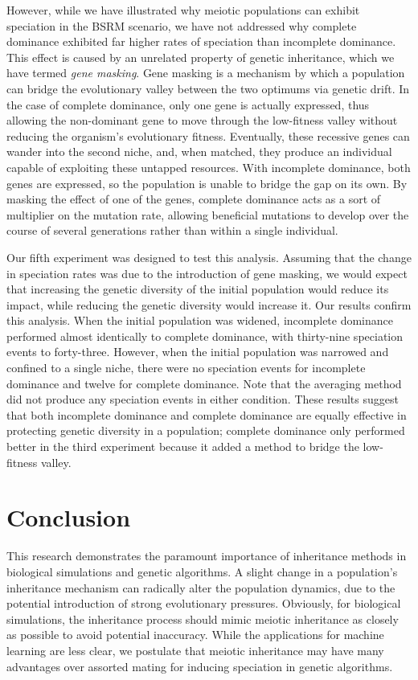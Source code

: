 \documentclass{article}
\begin{document}
However, while we have illustrated why meiotic populations can exhibit speciation in the BSRM scenario, we have not addressed why complete dominance exhibited far higher rates of speciation than incomplete dominance. This effect is caused by an unrelated property of genetic inheritance, which we have termed \textit{gene masking}. Gene masking is a mechanism by which a population can bridge the evolutionary valley between the two optimums via genetic drift. In the case of complete dominance, only one gene is actually expressed, thus allowing the non-dominant gene to move through the low-fitness valley without reducing the organism’s evolutionary fitness. Eventually, these recessive genes can wander into the second niche, and, when matched, they produce an individual capable of exploiting these untapped resources. With incomplete dominance, both genes are expressed, so the population is unable to bridge the gap on its own. By masking the effect of one of the genes, complete dominance acts as a sort of multiplier on the mutation rate, allowing beneficial mutations to develop over the course of several generations rather than within a single individual.

Our fifth experiment was designed to test this analysis. Assuming that the change in speciation rates was due to the introduction of gene masking, we would expect that increasing the genetic diversity of the initial population would reduce its impact, while reducing the genetic diversity would increase it. Our results confirm this analysis. When the initial population was widened, incomplete dominance performed almost identically to complete dominance, with thirty-nine speciation events to forty-three. However, when the initial population was narrowed and confined to a single niche, there were no speciation events for incomplete dominance and twelve for complete dominance. Note that the averaging method did not produce any speciation events in either condition. These results suggest that both incomplete dominance and complete dominance are equally effective in protecting genetic diversity in a population; complete dominance only performed better in the third experiment because it added a method to bridge the low-fitness valley.



\section{Conclusion}

This research demonstrates the paramount importance of inheritance methods in biological simulations and genetic algorithms. A slight change in a population’s inheritance mechanism can radically alter the population dynamics, due to the potential introduction of strong evolutionary pressures. Obviously, for biological simulations, the inheritance process should mimic meiotic inheritance as closely as possible to avoid potential inaccuracy. While the applications for machine learning are less clear, we postulate that meiotic inheritance may have many advantages over assorted mating for inducing speciation in genetic algorithms.
\end{document}
